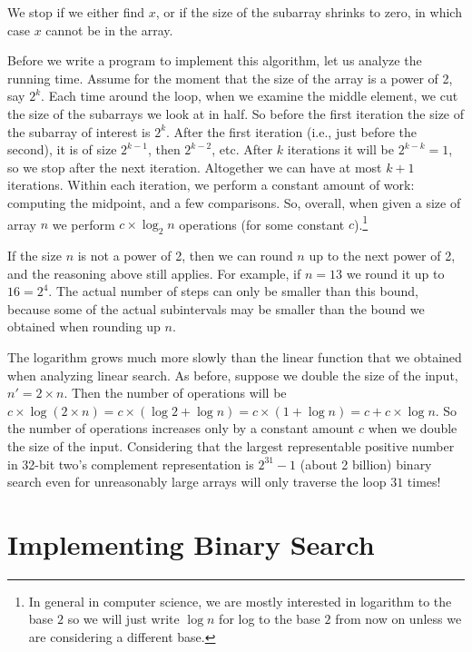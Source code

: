 We stop if we either find $x$, or if the size of the subarray
shrinks to zero, in which case $x$ cannot be in the array.

Before we write a program to implement this algorithm, let us analyze the
running time.  Assume for the moment that the size of the array is a power of
2, say $2^k$.  Each time around the loop, when we examine the middle element,
we cut the size of the subarrays we look at in half.  So before the first
iteration the size of the subarray of interest is $2^k$.  After the first
iteration (i.e., just before the second), it is of size $2^{k-1}$, then
$2^{k-2}$, etc.  After $k$ iterations it will be $2^{k-k} = 1$, so we stop
after the next iteration.  Altogether we can have at most $k+1$ iterations.
Within each iteration, we perform a constant amount of work: computing the
midpoint, and a few comparisons.  So, overall, when given a size of array $n$
we perform $c \times \log_2 n$ operations (for some constant
$c$).\footnote{In general in computer science, we are mostly interested in
  logarithm to the base $2$ so we will just write $\log n$ for log to
  the base $2$ from now on unless we are considering a different base.}

If the size $n$ is not a power of 2, then we can round $n$ up to the
next power of 2, and the reasoning above still applies.  For example,
if $n = 13$ we round it up to $16 = 2^4$.  The actual number of steps
can only be smaller than this bound, because some of the actual
subintervals may be smaller than the bound we obtained when rounding
up $n$.

The logarithm grows much more slowly than the linear function that we
obtained when analyzing linear search.  As before, suppose we double
the size of the input, $n' = 2 \times n$.  Then the number of
operations will be $c \times \log (2 \times n) = c \times (\log 2 +
\log n) = c \times (1 + \log n) = c + c \times \log n$.  So the number
of operations increases only by a constant amount $c$ when we double
the size of the input.  Considering that the largest representable
positive number in 32-bit two's complement representation is
$2^{31}-1$ (about 2 billion) binary search even for unreasonably large
arrays will only traverse the loop $31$ times!


\section{Implementing Binary Search}
\label{sec:binsearch:impl}

